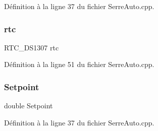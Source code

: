 Définition à la ligne 37 du fichier Serre\+Auto.\+cpp.

\mbox{\label{_serre_auto_8cpp_a7715afc6e8732f6f936183f5c0d76167}} 
\subsubsection{rtc}
{\footnotesize\ttfamily R\+T\+C\+\_\+\+D\+S1307 rtc}



Définition à la ligne 51 du fichier Serre\+Auto.\+cpp.

\mbox{\label{_serre_auto_8cpp_a75c4a1f32ff8946a7e4880300dc7d309}} 
\subsubsection{Setpoint}
{\footnotesize\ttfamily double Setpoint}



Définition à la ligne 37 du fichier Serre\+Auto.\+cpp.

